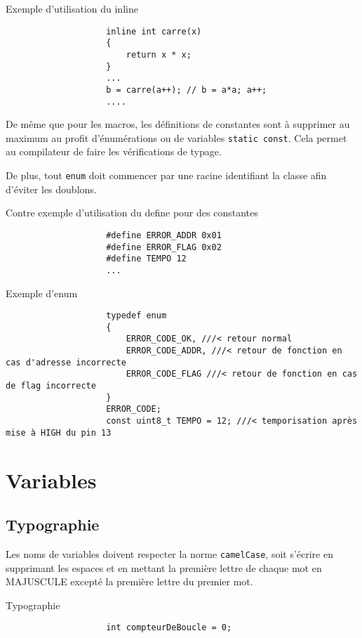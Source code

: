 			\begin{cbox}{Exemple d'utilisation du inline}
				\begin{verbatim}
					inline int carre(x)
					{
					    return x * x;
					}
					...
					b = carre(a++); // b = a*a; a++;
					....
				\end{verbatim}
			\end{cbox}

			De même que pour les macros, les définitions de constantes sont à supprimer au maximum au profit d’énumérations ou de variables \verb+static const+. Cela permet au compilateur de faire les vérifications de typage.

			De plus, tout \verb+enum+ doit commencer par une racine identifiant la classe afin d’éviter les doublons.
			
			\begin{cbox}{Contre exemple d'utilisation du define pour des constantes}
				\begin{verbatim}
					#define ERROR_ADDR 0x01
					#define ERROR_FLAG 0x02
					#define TEMPO 12
					...
				\end{verbatim}
			\end{cbox}
				
			\begin{cbox}{Exemple d'enum}
				\begin{verbatim}
					typedef enum
					{
					    ERROR_CODE_OK, ///< retour normal
					    ERROR_CODE_ADDR, ///< retour de fonction en cas d'adresse incorrecte
					    ERROR_CODE_FLAG ///< retour de fonction en cas de flag incorrecte
					}
					ERROR_CODE;
					const uint8_t TEMPO = 12; ///< temporisation après mise à HIGH du pin 13
				\end{verbatim}
			\end{cbox}

	\section{Variables}
		\subsection{Typographie}
			Les noms de variables doivent respecter la norme \verb+camelCase+, soit s'écrire en supprimant les espaces et en mettant la première lettre de chaque mot en MAJUSCULE excepté la première lettre du premier mot.

			\begin{cbox}{Typographie}
				\begin{verbatim}
					int compteurDeBoucle = 0;
				\end{verbatim}
			\end{cbox}

